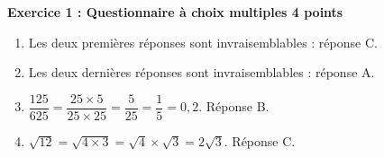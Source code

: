 \textbf{Exercice 1 : Questionnaire à choix multiples \hfill 4 points}

\medskip
 
%
%
\begin{enumerate}
\item Les deux premières réponses sont invraisemblables : réponse C.
\item Les deux dernières réponses sont invraisemblables : réponse A.
\item $\dfrac{125}{625} = \dfrac{25 \times 5}{25 \times 25} = \dfrac{5}{25} = \dfrac{1}{5} = 0,2$. Réponse B.
\item $\sqrt{12} = \sqrt{4 \times 3} = \sqrt{4} \times \sqrt{3} = 2\sqrt{3}$. Réponse C.
\end{enumerate}

\bigskip

